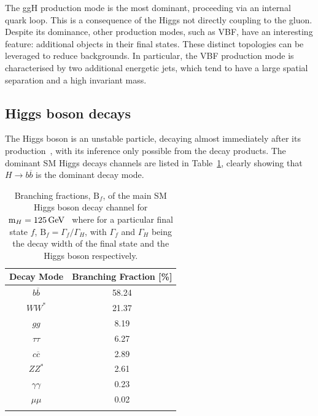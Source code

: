 The ggH production mode is the most dominant, proceeding via an internal quark loop. This is a consequence of the Higgs not directly coupling to the gluon. Despite its dominance, other production modes, such as VBF, have an interesting feature: additional objects in their final states. These distinct topologies can be leveraged to reduce backgrounds. In particular, the VBF production mode is characterised by two additional energetic jets, which tend to have a large spatial separation and a high invariant mass.

\subsection{Higgs boson decays}

The Higgs boson is an unstable particle, decaying almost immediately after its production~\cite{MarkThompson}, with its inference only possible from the decay products. The dominant SM Higgs decays channels are listed in Table~\ref{Table:Introduction_HiggsBranchingFractions}, clearly showing that $H\rightarrow b\overline{b}$ is the dominant decay mode. 

\begin{table}[h]
\centering
\renewcommand{\arraystretch}{1.5} %
\setlength{\tabcolsep}{12pt} %
\begin{tabular}{|c|c|}
\hline
Decay Mode                  & Branching Fraction {[}\%{]} \\ \hline \hline
$b\overline{b}$             & 58.24 \\ 
\arrayrulecolor{lightgray} \hline
$WW^*$                      & 21.37 \\ 
\arrayrulecolor{lightgray} \hline
$gg$                        & 8.19  \\ 
\arrayrulecolor{lightgray} \hline
$\tau\tau$                  & 6.27  \\ 
\arrayrulecolor{lightgray} \hline
$c\overline{c}$             & 2.89  \\ 
\arrayrulecolor{lightgray} \hline
$ZZ^*$                      & 2.61  \\ 
\arrayrulecolor{lightgray} \hline
$\gamma\gamma$              & 0.23  \\ 
\arrayrulecolor{lightgray} \hline
$\mu\mu$                    & 0.02  \\ 
\arrayrulecolor{black} \hline
\end{tabular}
\caption[Branching fractions of main SM Higgs decay channels at $\text{m}_H = 125\GeV$]{Branching fractions, $\text{B}_f$, of the main SM Higgs boson decay channel for $\text{m}_H = 125\GeV$~\cite{HiggsProduction_XS_13TeV,HiggsProduction_XS_13p6TeV} where for a particular final state $f$, $\text{B}_f = \Gamma_f/\Gamma_H$, with $\Gamma_f$ and $\Gamma_H$ being the decay width of the final state and the Higgs boson respectively.}
\label{Table:Introduction_HiggsBranchingFractions}
\end{table}

